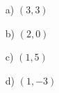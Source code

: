 \begin{itemize}
\item[a) ] $(3,3)$  
\item[b) ] $(2,0)$  
\item[c) ] $(1,5)$  
\item[d) ] $(1,-3)$  
\end{itemize}